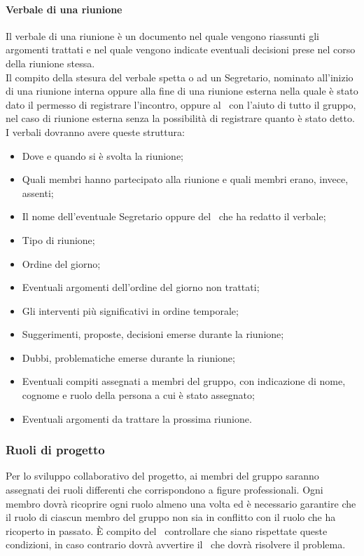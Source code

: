 \documentclass[../NormeProgetto.tex]{subfiles}
\begin{document}
			\paragraph{Verbale di una riunione}
			Il verbale di una riunione è un documento nel quale vengono riassunti gli argomenti trattati e nel quale vengono indicate eventuali decisioni prese nel corso della riunione stessa.\\ Il compito della stesura del verbale spetta o ad un Segretario, nominato all'inizio di una riunione interna oppure alla fine di una riunione esterna nella quale è stato dato il permesso di registrare l'incontro, oppure al \responsabilediprogetto\ con l'aiuto di tutto il gruppo, nel caso di riunione esterna senza la possibilità di registrare quanto è stato detto.\\ I verbali dovranno avere queste struttura:
			\begin{itemize}
			\item Dove e quando si è svolta la riunione;
			\item Quali membri hanno partecipato alla riunione e quali membri erano, invece, assenti;
			\item Il nome dell'eventuale Segretario oppure del \responsabilediprogetto\ che ha redatto il verbale;
			\item Tipo di riunione;
			\item Ordine del giorno;
			\item Eventuali argomenti dell'ordine del giorno non trattati;
			\item Gli interventi più significativi in ordine temporale;
			\item Suggerimenti, proposte, decisioni emerse durante la riunione;
			\item Dubbi, problematiche emerse durante la riunione;
			\item Eventuali compiti assegnati a membri del gruppo, con indicazione di nome, cognome e ruolo della persona a cui è stato assegnato;
			\item Eventuali argomenti da trattare la prossima riunione.
			\end{itemize}
		\subsubsection{Ruoli di progetto}
		Per lo sviluppo collaborativo del progetto, ai membri del gruppo saranno assegnati dei ruoli differenti che corrispondono a figure professionali. Ogni membro dovrà ricoprire ogni ruolo almeno una volta ed è necessario garantire che il ruolo di ciascun membro del gruppo non sia in conflitto con il ruolo che ha ricoperto in passato. È compito del \verificatore\ controllare che siano rispettate queste condizioni, in caso contrario dovrà avvertire il \responsabilediprogetto\ che dovrà risolvere il problema.
\end{document}
